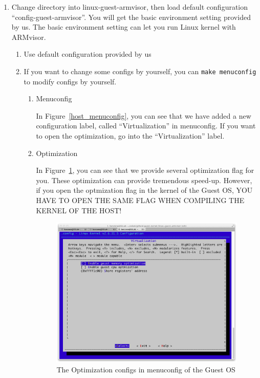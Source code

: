 \documentclass[12pt]{article}  %
\begin{document}
\begin{enumerate}
\item Change directory into linux-guest-armvisor, then load default configuration ``config-guest-armvisor''. You will get the basic environment setting provided by us. The basic environment setting can let you run Linux kernel with ARMvisor.
\begin{enumerate}
\item Use default configuration provided by us\newline
{}\newline
{}


\item If you want to change some configs by yourself, you can \texttt{make menuconfig} to modify configs by yourself.


\begin{enumerate}
\item Menuconfig

In Figure~\ref{host_menuconfig}, you can see that we have added a new configuration label, called ``Virtualization'' in menuconfig. If you want to open the optimization, go into the ``Virtualization'' label.

\item Optimization

In Figure~\ref{guest_menuconfig_opt}, you can see that we provide several optimization flag for you. These optimization can provide tremendous speed-up. However, if you open the optmization flag in the kernel of the Guest OS, YOU HAVE TO OPEN THE SAME FLAG WHEN COMPILING THE KERNEL OF THE HOST!

\begin{figure}[h]  %
\includegraphics[scale=0.36]{guest_menuconfig_opt.png}
\caption{The Optimization configs in menuconfig of the Guest OS} 
\label{guest_menuconfig_opt}
\end{figure}
\newpage


\end{enumerate}
\end{enumerate}
\end{enumerate}
\end{document}
